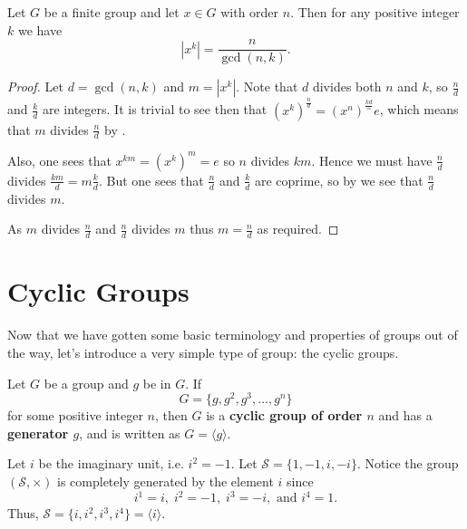 \begin{theorem}\label{thrm-order-of-power-of-element}
    Let $G$ be a finite group and let $x \in G$ with order $n$. Then for any positive integer $k$ we have
    \[
        \left|x^k\right| = \frac{n}{\gcd(n,k)}.
    \]
\end{theorem}
\begin{proof}
    Let $d = \gcd(n,k)$ and $m = |x^k|$. Note that $d$ divides both $n$ and $k$, so $\frac nd$ and $\frac kd$ are integers. It is trivial to see then that $(x^k)^{\frac nd} = \left(x^n\right)^\frac{kd} = e$, which means that $m$ divides $\frac nd$ by .

    Also, one sees that $x^{km} = (x^k)^m = e$ so $n$ divides $km$. Hence we must have $\frac nd$ divides $\frac {km}{d} = m\frac kd$. But one sees that $\frac nd$ and $\frac kd$ are coprime, so by  we see that $\frac nd$ divides $m$.

    As $m$ divides $\frac nd$ and $\frac nd$ divides $m$ thus $m = \frac nd$ as required.
\end{proof}

\section{Cyclic Groups}
Now that we have gotten some basic terminology and properties of groups out of the way, let's introduce a very simple type of group: the cyclic groups.

\begin{definition}
    Let $G$ be a group and $g$ be in $G$. If
    \[
        G = \{g, g^2, g^3, \dots, g^n\}
    \]
    for some positive integer $n$, then $G$ is a \textbf{cyclic group of order $n$} and has a \textbf{generator $g$}, and is written as $G = \langle g \rangle$.
\end{definition}

\begin{example}
    Let $i$ be the imaginary unit, i.e. $i^2 = -1$. Let $\mathcal{S} = \{1, -1, i, -i\}$. Notice the group $(\mathcal{S}, \times)$ is completely generated by the element $i$ since
    \[
    i^1 = i,\; i^2 = -1,\; i^3 = -i, \text{ and } i^4 = 1.
    \]
    Thus, $\mathcal{S} = \{i, i^2, i^3, i^4\} = \langle i \rangle$.
\end{example}


